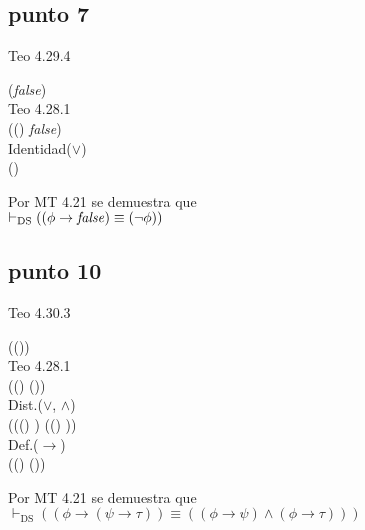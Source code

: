 \documentclass{article}
\begin{document}
\subsection{punto 7}
\begin{logicenv}{Teo 4.29.4}
    \begin{derivation}
            (\phi \to \textrm{\textit{false}})\\
        Teo 4.28.1\\
            ((\neg \phi) \lor \textrm{\textit{false}})\\
        Identidad($\lor$)\\
            (\neg \phi)
    \end{derivation}
    Por MT 4.21 se demuestra que\\
    $\vdash_{\text{DS}} ((\phi \to \textrm{\textit{false}}) \equiv (\neg \phi))$
\end{logicenv}

\subsection{punto 10}
\begin{logicenv}{Teo 4.30.3}
    \begin{derivation}
            (\phi \to (\psi \land \tau))\\
        Teo 4.28.1\\
            ((\neg \phi) \lor (\psi \land \tau))\\
        Dist.($\lor$, $\land$)\\
            (((\neg \phi) \lor \psi) \land ((\neg \phi) \lor \tau))\\
        Def.($\to$)\\
            ((\phi \to \psi) \land (\phi \to \tau))
    \end{derivation}
    Por MT 4.21 se demuestra que\\
    $\vdash_{\text{DS}} ((\phi \to (\psi \to \tau)) \equiv ((\phi \to \psi) \land (\phi \to \tau)))$
\end{logicenv}
\end{document}
